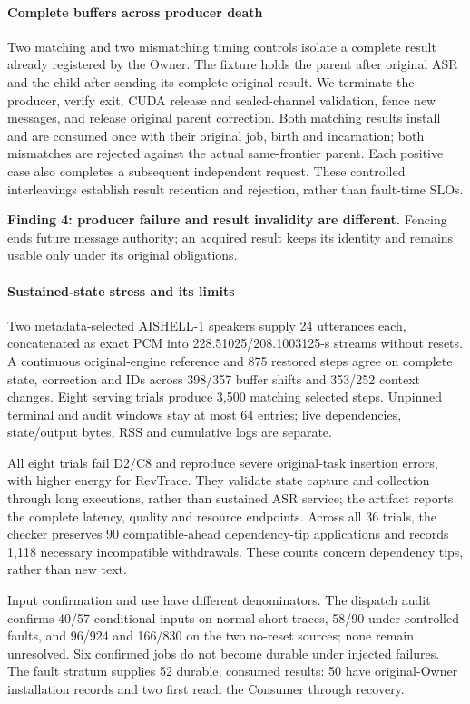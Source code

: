 \paragraph{Complete buffers across producer death}
Two matching and two mismatching timing controls isolate a complete result
already registered by the Owner. The fixture holds the parent after
original ASR and the child after sending its complete original result.
We terminate the producer, verify exit, CUDA release and sealed-channel
validation, fence new messages, and release original parent correction.
Both matching results install and are consumed once with their original
job, birth and incarnation; both mismatches are rejected against the
actual same-frontier parent. Each positive case also completes a subsequent
independent request. These controlled interleavings establish result
retention and rejection, rather than fault-time SLOs.
\par\noindent\textbf{Finding 4: producer failure and result invalidity are different.}
Fencing ends future message authority; an acquired result keeps its
identity and remains usable only under its original obligations.

\paragraph{Sustained-state stress and its limits}
Two metadata-selected AISHELL-1 speakers supply 24 utterances each,
concatenated as exact PCM into 228.51025/208.1003125-s streams without
resets. A continuous original-engine reference and 875 restored steps
agree on complete state, correction and IDs across 398/357 buffer shifts
and 353/252 context changes. Eight serving trials produce 3,500 matching
selected steps. Unpinned terminal and audit windows stay at most 64
entries; live dependencies, state/output bytes, RSS and cumulative logs
are separate.

All eight trials fail D2/C8 and reproduce severe original-task insertion
errors, with higher energy for RevTrace. They validate state capture and
collection through long executions, rather than sustained ASR service;
the artifact reports the complete latency, quality and resource endpoints.
Across all 36 trials, the checker preserves 90 compatible-ahead
dependency-tip applications and records 1,118 necessary incompatible
withdrawals. These counts concern dependency tips, rather than new text.

Input confirmation and use have different denominators. The dispatch
audit confirms 40/57 conditional inputs on normal short traces, 58/90
under controlled faults, and 96/924 and 166/830 on the two no-reset sources;
none remain unresolved. Six confirmed jobs do not become durable under
injected failures. The fault stratum supplies 52 durable, consumed results:
50 have original-Owner installation records and two first reach the
Consumer through recovery.
